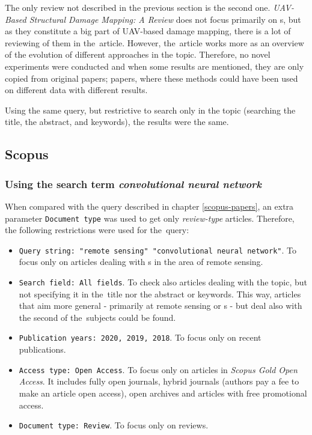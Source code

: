 The only review not described in the previous section is the second one. \textit{UAV-Based Structural Damage Mapping: A Review} does not focus primarily on s, but as they constitute a big part of UAV-based damage mapping, there is a lot of reviewing of them in the~article. However, the~article works more as an overview of the evolution of different approaches in the topic. Therefore, no novel experiments were conducted and when some results are mentioned, they are only copied from original papers; papers, where these methods could have been used on different data with different results.

Using the same query, but restrictive to search only in the topic (searching the title, the abstract, and keywords), the results were the same.

\subsection{Scopus}
\label{scopus-reviews}

\subsubsection{Using the search term \textit{convolutional neural network}}
\label{scopus-reviews-full-length}

When compared with the query described in chapter \ref{scopus-papers}, an extra parameter \verb|Document type| was used to get only \textit{review-type} articles. Therefore, the following restrictions were used for the~query:

\begin{itemize}
	\item \verb|Query string: "remote sensing" "convolutional neural network"|. To focus only on articles dealing with s in the area of remote sensing.
	\item \verb|Search field: All fields|. To check also articles dealing with the topic, but not specifying it in the~title nor the abstract or keywords. This way, articles that aim more general - primarily at remote sensing or s - but deal also with the second of the~subjects could be found.
	\item \verb|Publication years: 2020, 2019, 2018|. To focus only on recent publications.
	\item \verb|Access type: Open Access|. To focus only on articles in \textit{Scopus Gold Open Access}. It includes fully open journals, hybrid journals (authors pay a fee to make an article open access), open archives and articles with free promotional access.
	\item \verb|Document type: Review|. To focus only on reviews.
\end{itemize}

